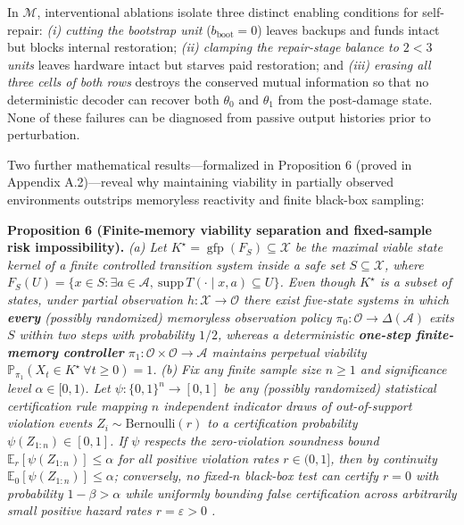 \documentclass[11pt,a4paper]{article}
\begin{document}
In \(\mathcal{M}\), interventional ablations isolate three distinct
enabling conditions for self-repair: \emph{(i) cutting the bootstrap
unit} (\(b_{\mathrm{boot}} = 0\)) leaves backups and funds intact but
blocks internal restoration; \emph{(ii) clamping the repair-stage
balance to \(2 < 3\) units} leaves hardware intact but starves paid
restoration; and \emph{(iii) erasing all three cells of both rows}
destroys the conserved mutual information \citep{coverThomas2006} so
that no deterministic decoder can recover both \(\theta_0\) and
\(\theta_1\) from the post-damage state. None of these failures can be
diagnosed from passive output histories prior to perturbation.

Two further mathematical results---formalized in Proposition 6 (proved
in Appendix A.2)---reveal why maintaining viability in partially
observed environments outstrips memoryless reactivity and finite
black-box sampling:

\textbf{Proposition 6 (Finite-memory viability separation and
fixed-sample risk impossibility).} \emph{(a) Let
\(K^\star = \operatorname{gfp}(F_S) \subseteq \mathcal{X}\) be the
maximal viable state kernel of a finite controlled transition system
inside a safe set \(S \subseteq \mathcal{X}\), where
\(F_S(U) = \{x \in S : \exists a \in \mathcal{A},\ \mathrm{supp}\,T(\cdot \mid x,a) \subseteq U\}\).
Even though \(K^\star\) is a subset of states, under partial observation
\(h: \mathcal{X} \to \mathcal{O}\) there exist five-state systems in
which \textbf{every} (possibly randomized) memoryless observation policy
\(\pi_0: \mathcal{O} \to \Delta(\mathcal{A})\) exits \(S\) within two
steps with probability \(1/2\), whereas a deterministic \textbf{one-step
finite-memory controller}
\(\pi_1: \mathcal{O} \times \mathcal{O} \to \mathcal{A}\) maintains
perpetual viability
\(\mathbb{P}_{\pi_1}(X_t \in K^\star\ \forall t \ge 0) = 1\).} \emph{(b)
Fix any finite sample size \(n \ge 1\) and significance level
\(\alpha \in [0, 1)\). Let \(\psi: \{0,1\}^n \to [0,1]\) be any
(possibly randomized) statistical certification rule mapping \(n\)
independent indicator draws of out-of-support violation events
\(Z_i \sim \mathrm{Bernoulli}(r)\) to a certification probability
\(\psi(Z_{1:n}) \in [0,1]\). If \(\psi\) respects the zero-violation
soundness bound \(\mathbb{E}_r[\psi(Z_{1:n})] \le \alpha\) for all
positive violation rates \(r \in (0,1]\), then by continuity
\(\mathbb{E}_0[\psi(Z_{1:n})] \le \alpha\); conversely, no fixed-\(n\)
black-box test can certify \(r = 0\) with probability
\(1-\beta > \alpha\) while uniformly bounding false certification across
arbitrarily small positive hazard rates \(r = \varepsilon > 0\)
\citep{leCam1973, mayo2018}.}
\end{document}
